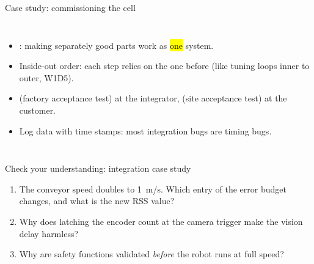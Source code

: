 \documentclass[aspectratio=169,10pt]{beamer}
\begin{document}
\begin{frame}{Case study: commissioning the cell}
\begin{columns}[T]
\centering
{}
\begin{itemize}\small
\item {}: making separately good parts work as \hl{one} system.
\item Inside-out order: each step relies on the one before (like tuning loops inner to outer, W1D5).
\item {} (factory acceptance test) at the integrator,  (site acceptance test) at the customer.
\item Log data with time stamps: most integration bugs are timing bugs.
\end{itemize}
\end{columns}
\end{frame}

\begin{frame}{Check your understanding: integration case study}
\begin{keybox}
\large
\begin{enumerate}
\item The conveyor speed doubles to \SI{1}{m/s}. Which entry of the error budget changes, and what is the new RSS value?
\item Why does latching the encoder count at the camera trigger make the vision delay harmless?
\item Why are safety functions validated \emph{before} the robot runs at full speed?
\end{enumerate}
\end{keybox}
\end{frame}
\end{document}
